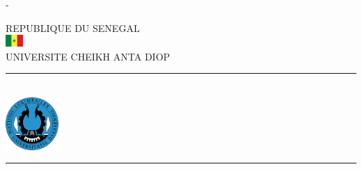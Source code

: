 %
%
% 
%
%
\begin{titlingpage}
	\begin{SingleSpace}
		\calccentering{\unitlength} 
		\begin{adjustwidth*}{\unitlength}{-\unitlength}
			\begin{center}
				{\large REPUBLIQUE DU SENEGAL }~\\[0.1cm]
				\includegraphics[width=0.05\textwidth]{Logos/senegal_flag.png}~\\[0.1cm]
				{\large UNIVERSITE CHEIKH ANTA DIOP }~\\[0.2cm]
				\hrule~\\[0.1cm]
				\includegraphics[width=0.15\textwidth]{Logos/logo_ucad.png}~\\[0.1cm]
				\hrule~\\[0.2cm]

\end{center}
\end{adjustwidth*}
\end{SingleSpace}
\end{titlingpage}
